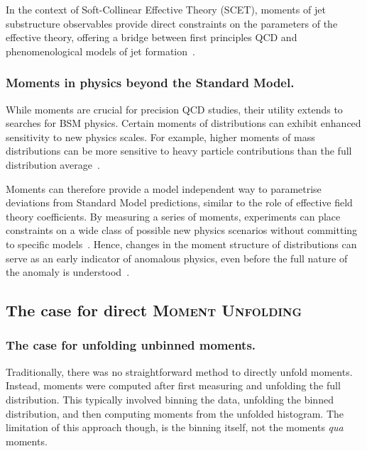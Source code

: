         In the context of Soft-Collinear Effective Theory (SCET), moments of jet substructure observables provide direct constraints on the parameters of the effective theory, offering a bridge between first principles QCD and phenomenological models of jet formation~\cite{Chien2014JetTheory, Ellis2010JetSCET, Lee2006MomentumTheory}.

        \subsubsection{Moments in physics beyond the Standard Model.}
            While moments are crucial for precision QCD studies, their utility extends to searches for BSM physics.
            Certain moments of distributions can exhibit enhanced sensitivity to new physics scales.
            For example, higher moments of mass distributions can be more sensitive to heavy particle contributions than the full distribution average~\cite{Buterus2023SomeDistributions, cowan_statistical_1998}.
    
            Moments can therefore provide a model independent way to parametrise deviations from Standard Model predictions, similar to the role of effective field theory coefficients.
            By measuring a series of moments, experiments can place constraints on a wide class of possible new physics scenarios without committing to specific models~\cite{Li2022MomentsPhysics, Larkoski2020JetLearning}.
            Hence, changes in the moment structure of distributions can serve as an early indicator of anomalous physics, even before the full nature of the anomaly is understood~\cite{Li2022MomentsPhysics, Metodiev2024AnomalyObservables, Romao2021FindingColliders}.

    \subsection{The case for direct \textsc{Moment Unfolding}}
        \subsubsection{The case for unfolding unbinned moments.}
            Traditionally, there was no straightforward method to directly unfold moments.
            Instead, moments were computed after first measuring and unfolding the full distribution.
            This typically involved binning the data, unfolding the binned distribution, and then computing moments from the unfolded histogram.
            The limitation of this approach though, is the binning itself, not the moments \textit{qua} moments.
            
